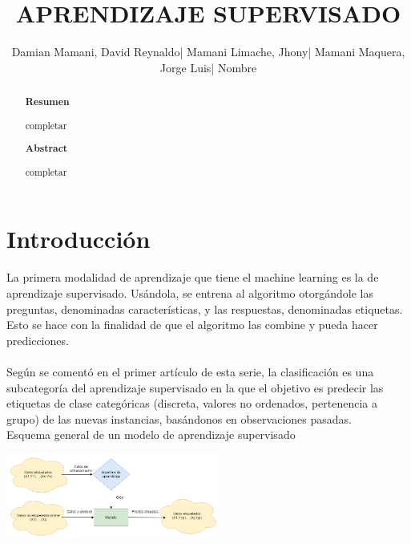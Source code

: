 \documentclass[%
 reprint,
 amsmath,amssymb,
 aps,
]{revtex4-1}
\begin{document}
\title{ APRENDIZAJE SUPERVISADO}
\author{Damian Mamani, David Reynaldo| Mamani Limache, Jhony| Mamani Maquera, Jorge Luis| Nombre}
		
%

\begin{abstract}
\begin{center}
\textbf{Resumen}
\end{center}
completar
\\

\begin{center}
\textbf{Abstract}
\end{center}
completar
\\
\end{abstract}



\maketitle


\section {Introducción}\label{sec:1}
La primera modalidad de aprendizaje que tiene el machine learning es la de aprendizaje supervisado. Usándola, se entrena al algoritmo otorgándole las preguntas, denominadas características, y las respuestas, denominadas etiquetas. Esto se hace con la finalidad de que el algoritmo las combine y pueda hacer predicciones.\\\\
Según se comentó en el primer artículo de esta serie, la clasificación es una subcategoría del aprendizaje supervisado en la que el objetivo es predecir las etiquetas de clase categóricas (discreta, valores no ordenados, pertenencia a grupo) de las nuevas instancias, basándonos en observaciones pasadas.\\
Esquema general de un modelo de aprendizaje supervisado
\begin{center}
\includegraphics[width=7cm]{./Imagenes/esquemageneraldelmodelosupervisado}
\end{center}
 
\end{document}
